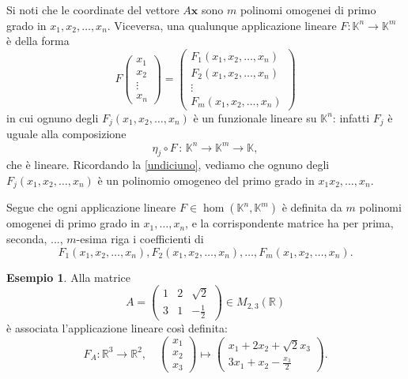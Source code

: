\documentclass{article}
\theoremstyle{plain}
\theoremstyle{definition}
\newtheorem{exmp}{Esempio}[section]
\theoremstyle{remark}
\begin{document}
Si noti che le coordinate del vettore $A\mathbf{x}$ sono $m$ polinomi omogenei di primo grado in $x_1, x_2, \ldots, x_n$. 
Viceversa, una qualunque applicazione lineare $F \colon \mathbb{K}^n \to \mathbb{K}^m$ è della forma
\[
F\begin{pmatrix}
    x_1\\
    x_2\\
    \vdots\\
    x_n
\end{pmatrix} = \begin{pmatrix}
    F_1(x_1, x_2, \ldots, x_n)\\
    F_2(x_1, x_2, \ldots, x_n)\\
    \vdots\\
    F_m(x_1, x_2, \ldots, x_n)
\end{pmatrix}
\]
in cui ognuno degli $F_j(x_1, x_2, \ldots, x_n)$ è un funzionale lineare su $\mathbb{K}^n$: infatti $F_j$ è uguale alla composizione
\[
\eta_j \circ F \,:\, \mathbb{K}^n \to \mathbb{K}^m \to \mathbb{K},
\]
che è lineare. Ricordando la \ref{undiciuno}, vediamo che ognuno degli $F_j(x_1, x_2, \ldots, x_n)$ è un polinomio omogeneo del primo grado in $x_1x_2, \ldots, x_n$.

\vspace{10pt}

Segue che ogni applicazione lineare $F\in\hom(\mathbb{K}^n,\mathbb{K}^m)$ è definita da $m$ polinomi omogenei di primo grado in $x_1, \ldots, x_n$, 
e la corrispondente matrice ha per prima, seconda, ..., $m$-esima riga i coefficienti di 
\[F_1(x_1, x_2, \ldots, x_n), F_2(x_1, x_2, \ldots, x_n), \ldots, F_m(x_1, x_2, \ldots, x_n).\]

\vspace{10pt}

\begin{exmp}
Alla matrice
\[
A = \begin{pmatrix}
1 & 2 & \sqrt{2} \\
3 & 1 & -\frac{1}{2}
\end{pmatrix} \in M_{2,3}(\mathbb{R})
\]
è associata l'applicazione lineare così definita:
\[
F_A \colon \mathbb{R}^3 \to \mathbb{R}^2,\quad \begin{pmatrix}x_1\\x_2\\x_3\end{pmatrix}\mapsto \begin{pmatrix}x_1 + 2x_2 + \sqrt{2}x_3\\3x_1 + x_2 - \frac{x_3}{2}\end{pmatrix}.
\]    
\end{exmp}
\end{document}
